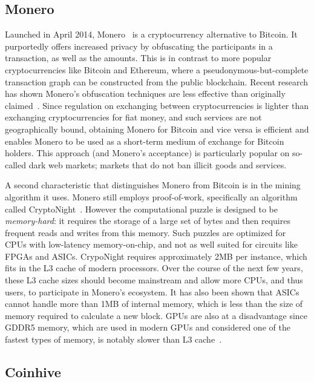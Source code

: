 \subsection{Monero}

Launched in April 2014, Monero~\cite{monero} is a cryptocurrency alternative to Bitcoin. It purportedly offers increased privacy by obfuscating the participants in a transaction, as well as the amounts. This is in contrast to more popular cryptocurrencies like Bitcoin and Ethereum, where a pseudonymous-but-complete transaction graph can be constructed from the public blockchain. Recent research has shown Monero's obfuscation techniques are less effective than originally claimed~\cite{MMLN17,kumar2017traceability}. Since regulation on exchanging between cryptocurrencies is lighter than exchanging cryptocurrencies for fiat money, and such services are not geographically bound, obtaining Monero for Bitcoin and vice versa is efficient and enables Monero to be used as a short-term medium of exchange for Bitcoin holders. This approach (and Monero's acceptance) is particularly popular on so-called dark web markets; markets that do not ban illicit goods and services.

A second characteristic that distinguishes Monero from Bitcoin is in the mining algorithm it uses. Monero still employs proof-of-work, specifically an algorithm called CryptoNight~\cite{cryptoknight}. However the computational puzzle is designed to be \textit{memory-hard}: it requires the storage of a large set of bytes and then requires frequent reads and writes from this memory. Such puzzles are optimized for CPUs with low-latency memory-on-chip, and not as well suited for circuits like FPGAs and ASICs. CrypoNight requires approximately 2MB per instance, which fits in the L3 cache of modern processors. Over the course of the next few years, these L3 cache sizes should become mainstream and allow more CPUs, and thus users, to participate in Monero's ecosystem. It has also been shown that ASICs cannot handle more than 1MB of internal memory, which is less than the size of memory required to calculate a new block. GPUs are also at a disadvantage since GDDR5 memory, which are used in modern GPUs and considered one of the fastest types of memory, is notably slower than L3 cache~\cite{van2013cryptonote}.  


\subsection{Coinhive}


